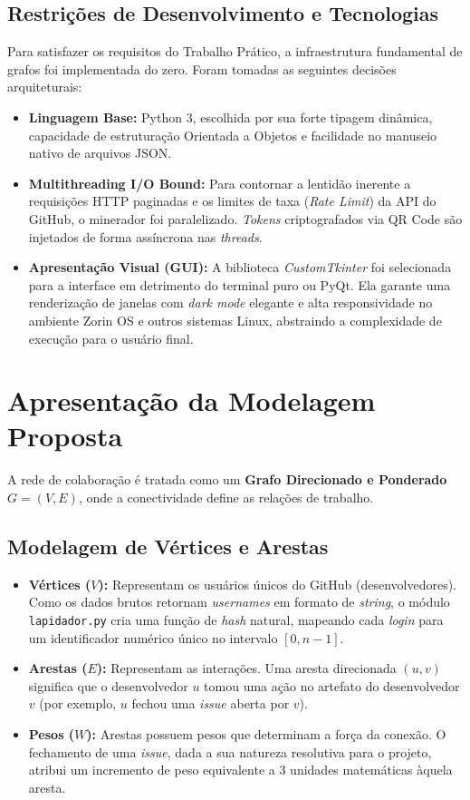 \documentclass[12pt, a4paper]{article}
\begin{document}
\subsection{Restrições de Desenvolvimento e Tecnologias}
Para satisfazer os requisitos do Trabalho Prático, a infraestrutura fundamental de grafos foi implementada do zero. Foram tomadas as seguintes decisões arquiteturais:
\begin{itemize}
    \item \textbf{Linguagem Base:} Python 3, escolhida por sua forte tipagem dinâmica, capacidade de estruturação Orientada a Objetos e facilidade no manuseio nativo de arquivos JSON.
    \item \textbf{Multithreading I/O Bound:} Para contornar a lentidão inerente a requisições HTTP paginadas e os limites de taxa (\textit{Rate Limit}) da API do GitHub, o minerador foi paralelizado. \textit{Tokens} criptografados via QR Code são injetados de forma assíncrona nas \textit{threads}.
    \item \textbf{Apresentação Visual (GUI):} A biblioteca \textit{CustomTkinter} foi selecionada para a interface em detrimento do terminal puro ou PyQt. Ela garante uma renderização de janelas com \textit{dark mode} elegante e alta responsividade no ambiente Zorin OS e outros sistemas Linux, abstraindo a complexidade de execução para o usuário final.
\end{itemize}

\section{Apresentação da Modelagem Proposta}

A rede de colaboração é tratada como um \textbf{Grafo Direcionado e Ponderado} $G = (V, E)$, onde a conectividade define as relações de trabalho.

\subsection{Modelagem de Vértices e Arestas}
\begin{itemize}
    \item \textbf{Vértices ($V$):} Representam os usuários únicos do GitHub (desenvolvedores). Como os dados brutos retornam \textit{usernames} em formato de \textit{string}, o módulo \texttt{lapidador.py} cria uma função de \textit{hash} natural, mapeando cada \textit{login} para um identificador numérico único no intervalo $[0, n-1]$.
    \item \textbf{Arestas ($E$):} Representam as interações. Uma aresta direcionada $(u, v)$ significa que o desenvolvedor $u$ tomou uma ação no artefato do desenvolvedor $v$ (por exemplo, $u$ fechou uma \textit{issue} aberta por $v$).
    \item \textbf{Pesos ($W$):} Arestas possuem pesos que determinam a força da conexão. O fechamento de uma \textit{issue}, dada a sua natureza resolutiva para o projeto, atribui um incremento de peso equivalente a 3 unidades matemáticas àquela aresta.
\end{itemize}
\end{document}
